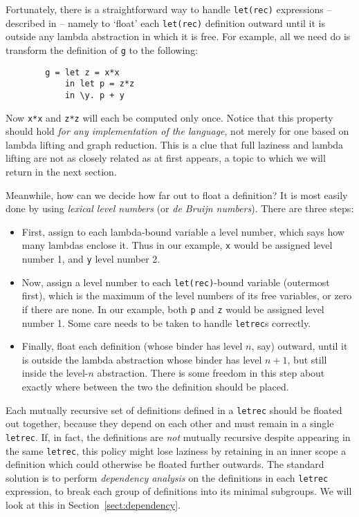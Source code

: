 Fortunately, there is a straightforward way to handle
\mbox{\tt let(rec)} expressions -- described in \cite[Chapter~15]{PJBook} --
namely to `float' each \mbox{\tt let(rec)} definition outward until it is
outside any lambda abstraction in which it is free.  For example, all
we need do is transform the definition of \mbox{\tt g} to the following:
\begin{verbatim}
        g = let z = x*x
            in let p = z*z
            in \y. p + y
\end{verbatim}
Now \mbox{\tt x*x} and \mbox{\tt z*z} will each be computed only once.  Notice that this
property should hold {\em for any implementation of the language}, not
merely for one based on lambda lifting and graph reduction.  This is a
clue that full laziness and lambda lifting are not as closely related
as at first appears, a topic to which we will return in the next
section.

Meanwhile, how can we decide how far out to float a definition?  It is
most easily done by using {\em lexical level numbers\/} (or {\em de Bruijn numbers\/}).
There are three steps:
\begin{itemize}
\item
First, assign to each lambda-bound variable a level number, which
says how many lambdas enclose it.   Thus in our example,
\mbox{\tt x} would be assigned level number 1, and \mbox{\tt y} level number 2.
\item
Now, assign a level number to each \mbox{\tt let(rec)}-bound variable (outermost
first), which is the maximum of the level numbers of its free
variables, or zero if there are none.
In our example, both \mbox{\tt p} and \mbox{\tt z} would be assigned level
number 1.  Some care needs to be taken to handle \mbox{\tt letrec}s correctly.

\item
Finally, float each definition (whose binder has level $n$, say)
outward, until it is outside the lambda abstraction whose binder has
level $n+1$, but still inside the level-$n$ abstraction.  There is
some freedom in this step about exactly where between the two the
definition should be placed.
\end{itemize}

Each mutually recursive set of definitions defined in a \mbox{\tt letrec}
should be floated out together, because they depend on each other and
must remain in a single \mbox{\tt letrec}.  If, in fact, the definitions are
{\em not\/} mutually recursive despite appearing in the same \mbox{\tt letrec},
this policy might lose laziness by retaining in an inner scope a
definition which could otherwise be floated further outwards.  The
standard solution is to perform {\em dependency
analysis\/} on the
definitions in each \mbox{\tt letrec} expression, to break each group of
definitions into its minimal subgroups.  We will look at this in
Section~\ref{sect:dependency}.

